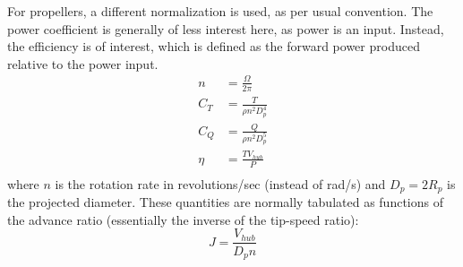 For propellers, a different normalization is used, as per usual convention.  The power coefficient is generally of less interest here, as power is an input.  Instead, the efficiency is of interest, which is defined as the forward power produced relative to the power input.
\begin{equation}
\begin{aligned}
n &= \frac{\Omega}{2 \pi} \\
C_T &= \frac{T}{\rho n^2 D_p^4}\\
C_Q &= \frac{Q}{\rho n^2 D_p^5}\\
\eta &= \frac{T V_{hub}}{P} \\
\end{aligned}
\end{equation}
where $n$ is the rotation rate in revolutions/sec (instead of rad/s) and $D_p = 2 R_p$ is the projected diameter.  These quantities are normally tabulated as functions of the advance ratio (essentially the inverse of the tip-speed ratio):
\begin{equation}
    J = \frac{V_{hub}}{D_p n}
\end{equation}






